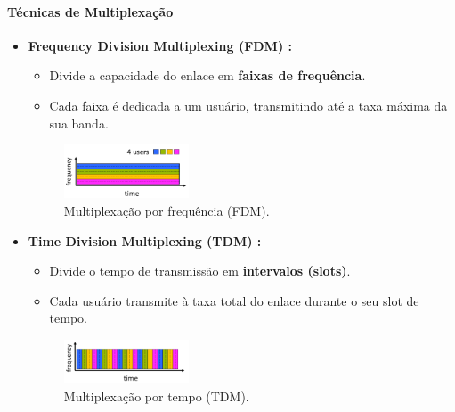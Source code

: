     \paragraph{Técnicas de Multiplexação}
    \begin{itemize}[left=0.5cm, align=left, nosep]
        \item \textbf{Frequency Division Multiplexing (FDM) :} 
        \begin{itemize}[left=0.5cm, nosep, label=$\hookrightarrow$]
            \item Divide a capacidade do enlace em \textbf{faixas de frequência}. 
            \item Cada faixa é dedicada a um usuário, transmitindo até a taxa máxima da sua banda. 
        \end{itemize} 
        
        \begin{figure}[H]
            \centering
            \includegraphics[width=0.35\textwidth]{img/cap-01/multiplexicacao-por-frequencia.png}
            \caption{Multiplexação por frequência (FDM).}
        \end{figure}

        \item \textbf{Time Division Multiplexing (TDM) :} 
        \begin{itemize}[left=0.5cm, nosep, label=$\hookrightarrow$]
            \item Divide o tempo de transmissão em \textbf{intervalos (slots)}. 
            \item Cada usuário transmite à taxa total do enlace durante o seu slot de tempo.
        \end{itemize}     
        
        \begin{figure}[H]
            \centering
            \includegraphics[width=0.35\textwidth]{img/cap-01/multiplexicacao-por-tempo.png}
            \caption{Multiplexação por tempo (TDM).}
        \end{figure}
    \end{itemize}

